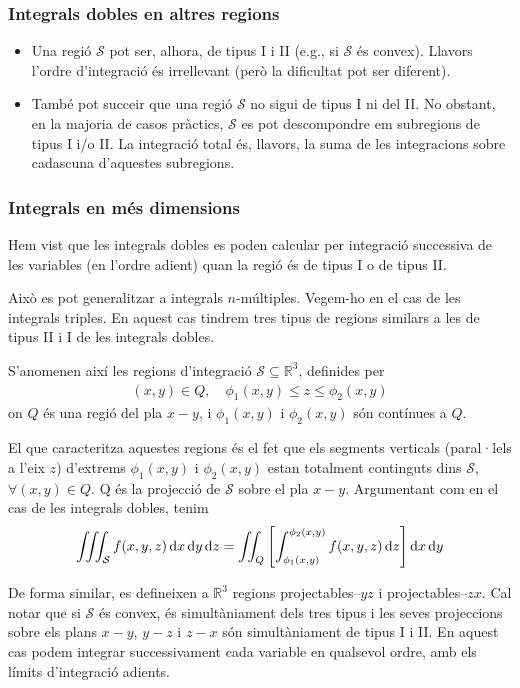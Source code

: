\subsubsection*{Integrals dobles en altres regions}
\begin{itemize}
	\item Una regió $\mathcal{S}$ pot ser, alhora, de tipus I i II (e.g., si $\mathcal{S}$ és convex). Llavors l'ordre d'integració és irrellevant (però la dificultat pot ser diferent).
	\item També pot succeir que una regió $\mathcal{S}$ no sigui de tipus I ni del II. No obstant, en la majoria de casos pràctics, $\mathcal{S}$ es pot descompondre em subregions de tipus I i/o II. La integració total és, llavors, la suma de les integracions sobre cadascuna d'aquestes subregions.
\end{itemize}

\subsubsection*{Integrals en més dimensions}
Hem vist que les integrals dobles es poden calcular per integració successiva de les variables (en l'ordre adient) quan la regió és de tipus I o de tipus II.

Això es pot generalitzar a integrals $n$-múltiples. Vegem-ho en el cas de les integrals triples. En aquest cas tindrem tres tipus de regions similars a les de tipus II i I de les integrals dobles.
\begin{defi}
	S'anomenen així les regions d'integració $\mathcal{S} \subseteq \mathbb{R}^{3}$, definides per
	\begin{align*}
		(x,y) \in Q, \quad \phi_{1}(x,y) \leq z \leq \phi_{2}(x,y)
	\end{align*}
	on $Q$ és una regió del pla $x-y$, i $\phi_{1}(x,y)$ i $\phi_{2}(x,y)$ són contínues a $Q$.

	El que caracteritza aquestes regions és el fet que els segments verticals (paral·lels a l'eix $z$) d'extrems $\phi_{1}(x,y)$ i $\phi_{2}(x,y)$ estan totalment continguts dins $\mathcal{S}$, $\forall (x,y) \in Q$. Q és la projecció de $\mathcal{S}$ sobre el pla $x-y$. Argumentant com en el cas de les integrals dobles, tenim
	\begin{align}
		\iiint_{\mathcal{S}} f(x,y,z) \mathop{}\!\mathrm{d} x \mathop{}\!\mathrm{d} y \mathop{}\!\mathrm{d} z = \iint_{Q}\left[ \int_{\phi_{1}(x,y)}^{\phi_{2}(x,y)} f(x,y,z) \mathop{}\!\mathrm{d} z \right] \mathop{}\!\mathrm{d} x \mathop{}\!\mathrm{d} y
	\end{align}
\end{defi}
De forma similar, es defineixen a $\mathbb{R}^{3}$ regions projectables--$yz$ i projectables--$zx$. Cal notar que si $\mathcal{S}$ és convex, és simultàniament dels tres tipus i les seves projeccions sobre els plans $x-y$, $y-z$ i $z-x$ són simultàniament de tipus I i II. En aquest cas podem integrar successivament cada variable en qualsevol ordre, amb els límits d'integració adients.

